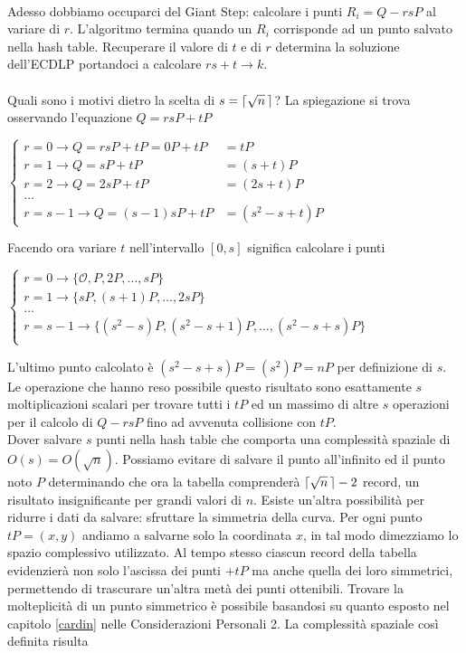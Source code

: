 \documentclass[a4paper,12pt]{tesiinfo}
\DeclarePairedDelimiter\ceil{\lceil}{\rceil}
\begin{document}
\\
Adesso dobbiamo occuparci del Giant Step: calcolare i punti $R_i=Q-rsP$ al variare di $r$. L'algoritmo termina quando un $R_i$ corrisponde ad un punto salvato nella hash table. Recuperare il valore di $t$ e di $r$ determina la soluzione dell'ECDLP portandoci a calcolare $rs+t \to k$.
\\
\\
Quali sono i motivi dietro la scelta di $s = \ceil{\sqrt{n} \,}$? La spiegazione si trova osservando l'equazione $Q = rsP+tP$
\begin{center}
$\begin{cases}
 r = 0  \to Q=rsP+tP=0P+tP & =tP \\
 r = 1  \to Q=sP+tP & = (s+t)P \\
 r = 2  \to Q=2sP+tP &= (2s+t)P\\
 \ldots \\ 
 r = s-1  \to Q=(s-1)sP+tP &= (s^2-s+t)P
\end{cases}$
\end{center}
Facendo ora variare $t$ nell'intervallo $[0, s]$ significa calcolare i punti 
\begin{center}
$\begin{cases}
 r=0 \to \{\mathcal{O}, P, 2P, \ldots, sP\}\\
 r=1 \to \{sP, (s+1)P, \ldots, 2sP\}\\
 \ldots \\ 
 r=s-1 \to \{(s^2-s)P, (s^2-s+1)P, \ldots, (s^2-s+s)P\}\\
\end{cases}$
\end{center}
L'ultimo punto calcolato \`e $(s^2-s+s)P = (s^2)P = nP$ per definizione di $s$.
\\
Le operazione che hanno reso possibile questo risultato sono esattamente $s$ moltiplicazioni scalari per trovare tutti i $tP$ ed un massimo di altre $s$ operazioni per il calcolo di $Q-rsP$ fino ad avvenuta collisione con $tP$.
\\
Dover salvare $s$ punti nella hash table che comporta una complessit\`a spaziale di $O(s) = O(\sqrt{n})$. Possiamo evitare di salvare il punto all'infinito ed il punto noto $P$ determinando che ora la tabella comprender\`a $\ceil{\sqrt{n} \,} -2$ record, un risultato insignificante per grandi valori di $n$. Esiste un'altra possibilit\`a per ridurre i dati da salvare: sfruttare la simmetria della curva. Per ogni punto $tP=(x, y)$ andiamo a salvarne solo la coordinata $x$, in tal modo dimezziamo lo spazio complessivo utilizzato. Al tempo stesso ciascun record della tabella evidenzier\`a non solo l'ascissa dei punti $+tP$ ma anche quella dei loro simmetrici, permettendo di trascurare un'altra met\`a dei punti ottenibili. Trovare la molteplicit\`a di un punto simmetrico \`e possibile basandosi su quanto esposto nel capitolo \ref{cardin} nelle Considerazioni Personali 2. La complessit\`a spaziale cos\`i definita risulta 
\end{document}
